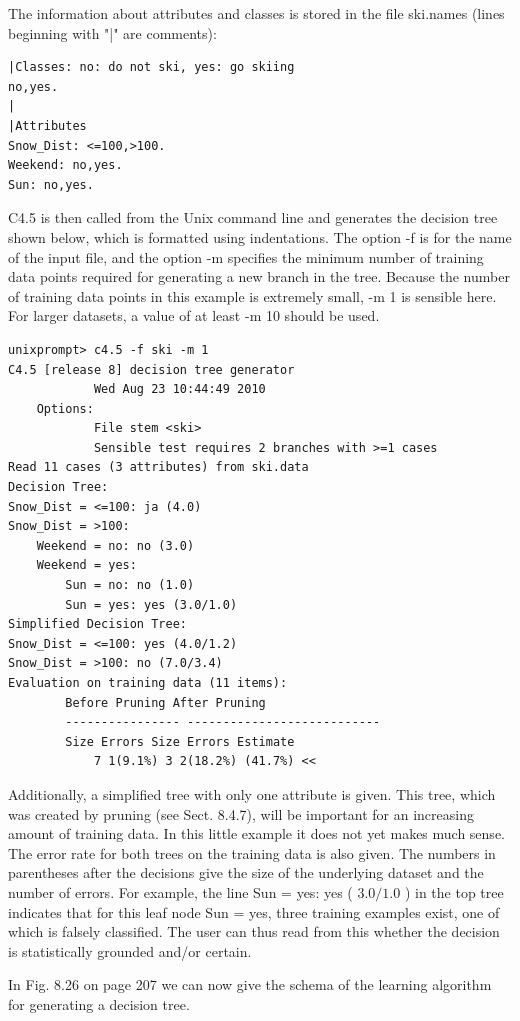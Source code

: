 \documentclass[10pt]{article}
\begin{document}
The information about attributes and classes is stored in the file ski.names (lines beginning with "|" are comments):

\begin{verbatim}
|Classes: no: do not ski, yes: go skiing
no,yes.
|
|Attributes
Snow_Dist: <=100,>100.
Weekend: no,yes.
Sun: no,yes.
\end{verbatim}

C4.5 is then called from the Unix command line and generates the decision tree shown below, which is formatted using indentations. The option -f is for the name of the input file, and the option -m specifies the minimum number of training data points required for generating a new branch in the tree. Because the number of training data points in this example is extremely small, -m 1 is sensible here. For larger datasets, a value of at least -m 10 should be used.

\begin{verbatim}
unixprompt> c4.5 -f ski -m 1
C4.5 [release 8] decision tree generator
            Wed Aug 23 10:44:49 2010
    Options:
            File stem <ski>
            Sensible test requires 2 branches with >=1 cases
Read 11 cases (3 attributes) from ski.data
Decision Tree:
Snow_Dist = <=100: ja (4.0)
Snow_Dist = >100:
    Weekend = no: no (3.0)
    Weekend = yes:
        Sun = no: no (1.0)
        Sun = yes: yes (3.0/1.0)
Simplified Decision Tree:
Snow_Dist = <=100: yes (4.0/1.2)
Snow_Dist = >100: no (7.0/3.4)
Evaluation on training data (11 items):
        Before Pruning After Pruning
        ---------------- ---------------------------
        Size Errors Size Errors Estimate
            7 1(9.1%) 3 2(18.2%) (41.7%) <<
\end{verbatim}

Additionally, a simplified tree with only one attribute is given. This tree, which was created by pruning (see Sect. 8.4.7), will be important for an increasing amount of training data. In this little example it does not yet makes much sense. The error rate for both trees on the training data is also given. The numbers in parentheses after the decisions give the size of the underlying dataset and the number of errors. For example, the line Sun = yes: yes ( $3.0 / 1.0$ ) in the top tree indicates that for this leaf node Sun = yes, three training examples exist, one of which is falsely classified. The user can thus read from this whether the decision is statistically grounded and/or certain.

In Fig. 8.26 on page 207 we can now give the schema of the learning algorithm for generating a decision tree.
\end{document}

